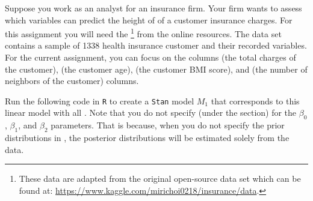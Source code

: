 \setcounter{section}{8}
\setcounter{subsection}{6}
\setcounter{question}{0}



Suppose you work as an analyst for an insurance firm. Your firm wants to assess which variables can predict the height of of a customer insurance charges. For this assignment you will need the \footnote{These data are adapted from the original open-source data set which can be found at: \url{https://www.kaggle.com/mirichoi0218/insurance/data}.} from the online resources. The data set contains a sample of 1338 health insurance customer and their recorded variables. For the current assignment, you can focus on the columns  (the total charges of the customer),  (the customer age),  (the customer BMI score), and  (the number of neighbors of the customer) columns. \\


\rcodeanswertiny



Run the following code in \texttt{R} to create a \texttt{Stan} model $M_1$ that corresponds to this linear model with all . Note that you do not specify  (under the  section) for the $\beta_0$, $\beta_1$, and $\beta_2$ parameters. That is because, when you do not specify the prior distributions in , the posterior distributions will be estimated solely from the data. \\

\clearpage %

